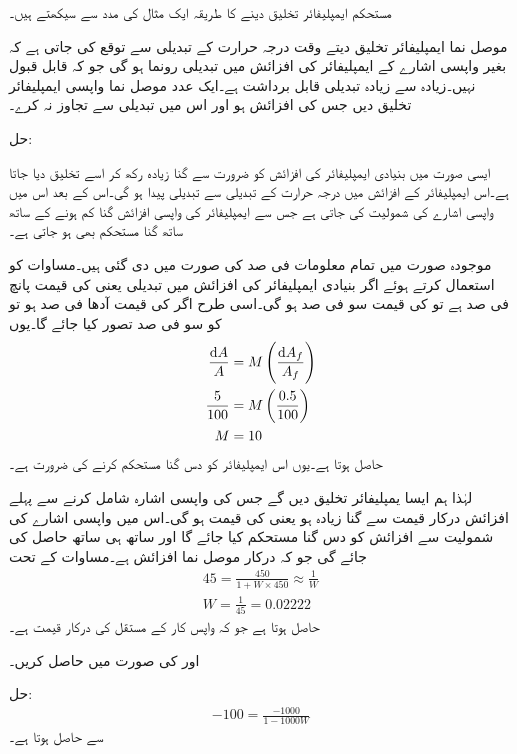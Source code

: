 مستحکم ایمپلیفائر تخلیق دینے کا طریقہ ایک مثال کی مدد سے سیکھتے ہیں۔

موصل نما ایمپلیفائر تخلیق دیتے وقت درجہ حرارت کے تبدیلی سے توقع کی جاتی ہے کہ بغیر واپسی اشارے کے ایمپلیفائر کی افزائش میں  تبدیلی رونما ہو گی جو کہ قابل قبول نہیں۔زیادہ سے زیادہ  تبدیلی قابل برداشت ہے۔ایک عدد موصل نما واپسی ایمپلیفائر تخلیق دیں جس کی افزائش  ہو اور اس میں تبدیلی  سے تجاوز نہ کرے۔

حل: 

ایسی صورت میں بنیادی ایمپلیفائر کی افزائش  کو ضرورت سے  گنا زیادہ رکھ کر اسے تخلیق دیا جاتا ہے۔اس ایمپلیفائر کے افزائش میں درجہ حرارت کے تبدیلی سے  تبدیلی پیدا ہو گی۔اس کے بعد اس میں واپسی اشارے کی شمولیت کی جاتی ہے جس سے ایمپلیفائر کی واپسی افزائش  گنا کم ہونے کے ساتھ ساتھ  گنا مستحکم بھی ہو جاتی ہے۔

موجودہ صورت میں تمام معلومات فی صد کی صورت میں دی گئی ہیں۔مساوات  کو استعمال کرتے ہوئے اگر بنیادی ایمپلیفائر کی افزائش میں تبدیلی یعنی   کی قیمت پانچ فی صد ہے تو  کی قیمت سو فی صد ہو گی۔اسی طرح اگر   کی قیمت  آدھا فی صد ہو تو  کو سو فی صد تصور کیا جائے گا۔یوں
\begin{align*}
\frac{\textup{d}A}{A} &=M  \left (\frac{\textup{d}A_f}{A_f} \right)\\
\frac{5}{100}&=M \left (\frac{0.5}{100} \right)\\
M &=10
\end{align*}
حاصل ہوتا ہے۔یوں اس ایمپلیفائر کو دس گنا مستحکم کرنے کی ضرورت ہے۔

لہٰذا ہم ایسا یمپلیفائر تخلیق دیں گے جس کی واپسی اشارہ شامل کرنے سے پہلے افزائش درکار قیمت سے   گنا زیادہ ہو  یعنی  کی قیمت  ہو گی۔اس میں واپسی اشارے کی شمولیت سے افزائش کو دس گنا مستحکم کیا جائے گا اور ساتھ ہی ساتھ  حاصل کی جائے گی جو کہ درکار موصل نما افزائش ہے۔مساوات  کے تحت
\begin{align*}
45 =\frac{450}{1+W \times 450} \approx \frac{1}{W} \\
W =\frac{1}{45}=\num{0.02222}
\end{align*}
حاصل ہوتا ہے جو کہ واپس کار  کے مستقل کی درکار قیمت ہے۔

 اور  کی صورت میں  حاصل کریں۔

حل:
\begin{align*}
-100 = \frac{-1000}{1-1000 W}
\end{align*}
سے   حاصل ہوتا ہے۔

